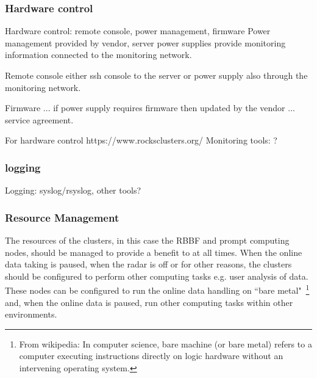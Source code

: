 \documentclass[12pt,a4paper]{article}
\begin{document}
\subsubsection{Hardware control} \label{ssec:hardware}

Hardware control: remote console, power management, firmware 
Power management provided by vendor, server power supplies provide monitoring information
connected to the monitoring network.

Remote console
either ssh console to the server or power supply also through the monitoring network.

Firmware ... if power supply requires firmware then updated by the vendor ... service agreement.


For hardware control 
https://www.rocksclusters.org/
Monitoring tools: ?%

\subsubsection{logging} \label{ssec:logging}
Logging: syslog/rsyslog, other tools? %



\subsubsection{Resource Management} \label{ssec:resource}
The resources of the clusters, in this case the RBBF and prompt computing nodes, should be managed to provide a benefit to \ED at all times.
When the online data taking is paused, when the radar is off or for other reasons, the clusters should be configured to perform other computing tasks e.g. user analysis of data.
These nodes can be configured to run the online data handling on ``bare metal"~\footnote{From wikipedia: In computer science, bare machine (or bare metal) refers to a computer executing instructions directly on logic hardware without an intervening operating system.} and, when the online data is paused, run other computing tasks within other environments.
\end{document}
